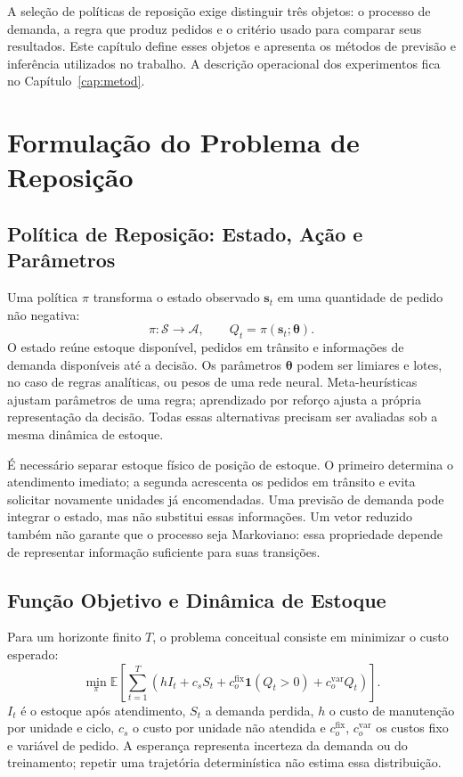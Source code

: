 
A seleção de políticas de reposição exige distinguir três objetos: o processo de demanda, a regra que produz pedidos e o critério usado para comparar seus resultados. Este capítulo define esses objetos e apresenta os métodos de previsão e inferência utilizados no trabalho. A descrição operacional dos experimentos fica no Capítulo~\ref{cap:metod}.

\section{Formulação do Problema de Reposição}
\label{sec:formulacao_problema}
\subsection{Política de Reposição: Estado, Ação e Parâmetros}
\label{sec:estado_acao_parametros}

Uma política $\pi$ transforma o estado observado $\mathbf{s}_t$ em uma quantidade de pedido não negativa:
\[
\pi:\mathcal S\rightarrow\mathcal A,\qquad Q_t=\pi(\mathbf{s}_t;\boldsymbol\theta).
\]
O estado reúne estoque disponível, pedidos em trânsito e informações de demanda disponíveis até a decisão. Os parâmetros $\boldsymbol\theta$ podem ser limiares e lotes, no caso de regras analíticas, ou pesos de uma rede neural. Meta-heurísticas ajustam parâmetros de uma regra; aprendizado por reforço ajusta a própria representação da decisão. Todas essas alternativas precisam ser avaliadas sob a mesma dinâmica de estoque.

É necessário separar estoque físico de posição de estoque. O primeiro determina o atendimento imediato; a segunda acrescenta os pedidos em trânsito e evita solicitar novamente unidades já encomendadas. Uma previsão de demanda pode integrar o estado, mas não substitui essas informações. Um vetor reduzido também não garante que o processo seja Markoviano: essa propriedade depende de representar informação suficiente para suas transições.

\subsection{Função Objetivo e Dinâmica de Estoque}
\label{sec:funcao_objetivo}

Para um horizonte finito $T$, o problema conceitual consiste em minimizar o custo esperado:
\begin{equation}
\min_\pi\mathbb E\left[\sum_{t=1}^{T}\left(hI_t+c_sS_t+c_o^{\mathrm{fix}}\mathbf1(Q_t>0)+c_o^{\mathrm{var}}Q_t\right)\right].
\label{eq:obj_inv_control}
\end{equation}
$I_t$ é o estoque após atendimento, $S_t$ a demanda perdida, $h$ o custo de manutenção por unidade e ciclo, $c_s$ o custo por unidade não atendida e $c_o^{\mathrm{fix}}$, $c_o^{\mathrm{var}}$ os custos fixo e variável de pedido. A esperança representa incerteza da demanda ou do treinamento; repetir uma trajetória determinística não estima essa distribuição.

